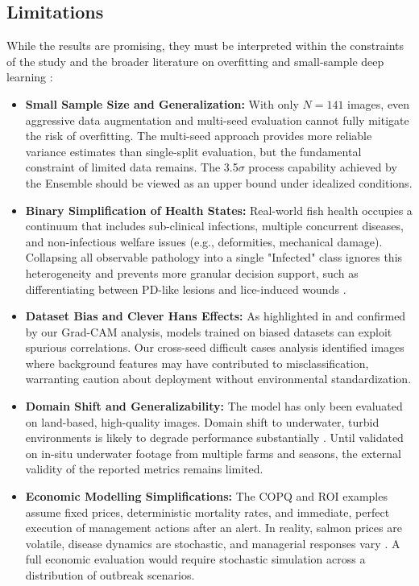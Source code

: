\documentclass[12pt,a4paper]{article}
\begin{document}
\subsection{Limitations}
While the results are promising, they must be interpreted within the constraints of the study and the broader literature on overfitting and small-sample deep learning \citep{BejaniGhatee2021, Shorten2019}:
\begin{itemize}
    \item \textbf{Small Sample Size and Generalization:} With only $N=141$ images, even aggressive data augmentation and multi-seed evaluation cannot fully mitigate the risk of overfitting. The multi-seed approach provides more reliable variance estimates than single-split evaluation, but the fundamental constraint of limited data remains. The 3.5$\sigma$ process capability achieved by the Ensemble should be viewed as an upper bound under idealized conditions.
    \item \textbf{Binary Simplification of Health States:} Real-world fish health occupies a continuum that includes sub-clinical infections, multiple concurrent diseases, and non-infectious welfare issues (e.g., deformities, mechanical damage). Collapsing all observable pathology into a single "Infected" class ignores this heterogeneity and prevents more granular decision support, such as differentiating between PD-like lesions and lice-induced wounds \citep{Deng2025}.
    \item \textbf{Dataset Bias and Clever Hans Effects:} As highlighted in \cite{Lapuschkin2019} and confirmed by our Grad-CAM analysis, models trained on biased datasets can exploit spurious correlations. Our cross-seed difficult cases analysis identified images where background features may have contributed to misclassification, warranting caution about deployment without environmental standardization.
    \item \textbf{Domain Shift and Generalizability:} The model has only been evaluated on land-based, high-quality images. Domain shift to underwater, turbid environments is likely to degrade performance substantially \citep{10048777, JIAN2021116088}. Until validated on in-situ underwater footage from multiple farms and seasons, the external validity of the reported metrics remains limited.
    \item \textbf{Economic Modelling Simplifications:} The COPQ and ROI examples assume fixed prices, deterministic mortality rates, and immediate, perfect execution of management actions after an alert. In reality, salmon prices are volatile, disease dynamics are stochastic, and managerial responses vary \citep{AUNSMO2010233, IVERSEN2020735089}. A full economic evaluation would require stochastic simulation across a distribution of outbreak scenarios.

\end{itemize}
\end{document}

